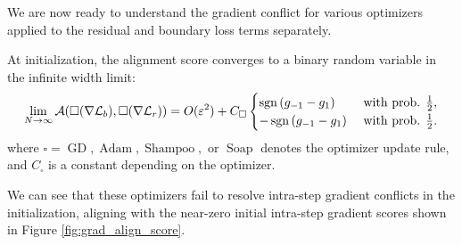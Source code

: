 We are now ready to understand the gradient conflict for various optimizers applied to the residual and boundary loss terms separately. 
\begin{proposition} 
\label{prop: grad_align}
At initialization, the alignment score converges to a binary random variable in the infinite width limit:
\begin{align}
    \lim_{N \rightarrow \infty }\mathcal{A}(\square(\nabla \mathcal{L}_b),\square(\nabla \mathcal{L}_r)) = O(\varepsilon^2) + C_\square \begin{cases}\operatorname{sgn}\left(g_{-1}-g_1\right) & \text { with prob. } \frac{1}{2}, \\ -\operatorname{sgn}\left(g_{-1}-g_1\right) & \text { with prob. } \frac{1}{2} .\end{cases}
\end{align}
where $\square = \operatorname{GD}, \operatorname{Adam}, \operatorname{Shampoo}, \text{ or } \operatorname{Soap}$  
 denotes the optimizer update rule, and
$C_\square$ is a constant depending on the optimizer. 
\end{proposition}

 We can see that these optimizers fail to resolve intra-step gradient conflicts in the initialization, aligning with the near-zero initial intra-step gradient scores shown in Figure \ref{fig:grad_align_score}. 



